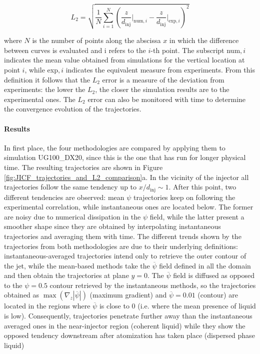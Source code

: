 \begin{equation}
\label{eq:L2_JICF}
    L_2 = \sqrt{\frac{1}{N}   \sum_{i=1}^N \left( \frac{z}{d_\mathrm{inj}} \Bigr|_{\mathrm{num},i} -   \frac{z}{d_\mathrm{inj}} \Bigr|_{\mathrm{exp},i} \right)^2}
\end{equation}

where $N$ is the number of points along the abscissa $x$ in which the difference between curves is evaluated and i refers to the $i$-th point. The subscript num$,i$ indicates the mean value obtained from simulations for the vertical location at point $i$, while exp$,i$ indicates the equivalent measure from experiments. From this definition it follows that the $L_2$ error is a measure of the deviation from experiments: the lower the $L_2$, the closer the simulation results are to the experimental ones. The $L_2$ error can also be monitored with time to determine the convergence evolution of the trajectories. \\

\paragraph*{Results}

In first place, the four methodologies are compared by applying them to simulation UG100\_DX20, since this is the one that has run for longer physical time. The resulting trajectories are shown in Figure \ref{fig:JICF_trajectories_and_L2_comparison}a. In the vicinity of the injector all trajectories follow the same tendency up to $x/d_\mathrm{inj} \sim 1$. After this point, two different tendencies are observed: mean $\psi$ trajectories keep on following the experimental correlation, while instantaneous ones are located below. The former are noisy due to numerical dissipation in the $\psi$ field, while the latter present a smoother shape since they are obtained by interpolating instantaneous trajectories and averaging them with time. The different trends shown by the trajectories from both methodologies are due to their underlying definitions: instantaneous-averaged trajectories intend only to retrieve the outer contour of the jet, while the mean-based methods take the $\overline{\psi}$ field defined in all the domain and then obtain the trajectories at plane $y = 0$. The $\overline{\psi}$ field is diffused as opposed to the $\psi = 0.5$ contour retrieved by the instantaneous methods, so the trajectories obtained as $\max \left( \nabla_z | \overline{\psi} | \right)$ (maximum gradient) and $\overline{\psi} = 0.01$ (contour) are located in the regions where $\overline{\psi}$ is close to $0$ (i.e. where the mean presence of liquid is low). Consequently, trajectories penetrate further away than the instantaneous averaged ones in the near-injector region (coherent liquid) while they show the opposed tendency downstream after atomization has taken place (dispersed phase liquid) \\


